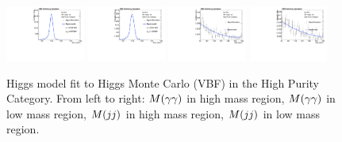 \begin{figure}[h]
  \centering
\includegraphics[width=0.23\textwidth]{figures/sec-signals/HiggsShapes/vbf_HM_signal_fit_mgg_cat0.pdf}
\includegraphics[width=0.23\textwidth]{figures/sec-signals/HiggsShapes/vbf_LM_signal_fit_mgg_cat0.pdf}
\includegraphics[width=0.23\textwidth]{figures/sec-signals/HiggsShapes/vbf_HM_signal_fit_mjj_cat0.pdf}
\includegraphics[width=0.23\textwidth]{figures/sec-signals/HiggsShapes/vbf_LM_signal_fit_mjj_cat0.pdf}
  \caption{Higgs model fit to Higgs Monte Carlo (VBF) in the High Purity Category. From left to right: $M(\gamma\gamma)$ in high mass region, $M(\gamma\gamma)$ in low mass region, $M(jj)$ in high mass region, $M(jj)$ in low mass region.}
  \label{fig:higgs_fit_vbf}
\end{figure}

